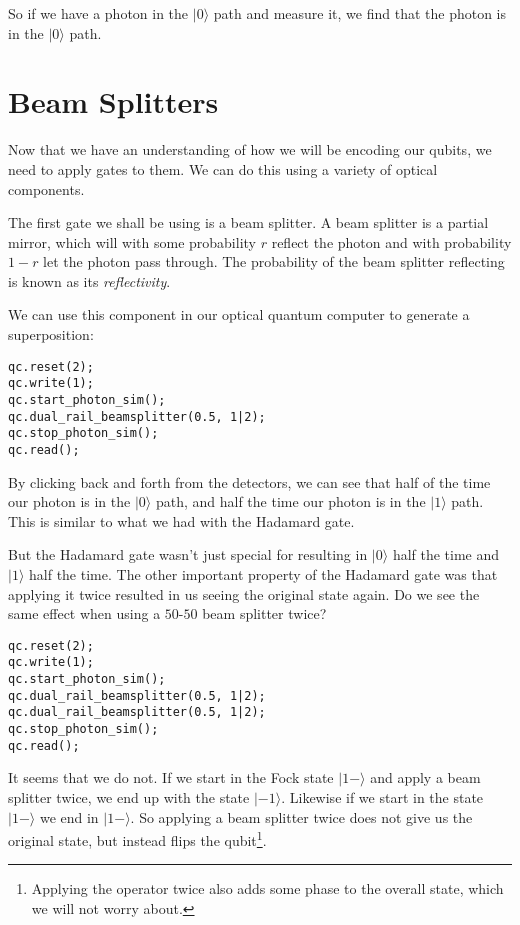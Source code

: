\documentclass[twocolumn]{article}
\begin{document}
So if we have a photon in the $|0\rangle$ path and measure it, we find that the photon is in the $|0\rangle$ path.

\section{Beam Splitters}

Now that we have an understanding of how we will be encoding our qubits, we need to apply gates to them. We can do this using a variety of optical components.

The first gate we shall be using is a beam splitter. A beam splitter is a partial mirror, which will with some probability $r$ reflect the photon and with probability $1 - r$ let the photon pass through. The probability of the beam splitter reflecting is known as its {\em reflectivity}.

We can use this component in our optical quantum computer to generate a superposition:

\begin{lstlisting}
qc.reset(2);
qc.write(1);
qc.start_photon_sim();
qc.dual_rail_beamsplitter(0.5, 1|2);
qc.stop_photon_sim();
qc.read();
\end{lstlisting}

By clicking back and forth from the detectors, we can see that half of the time  our photon is in the $|0\rangle$ path, and half the time our photon is in the $|1\rangle$ path. This is similar to what we had with the Hadamard gate.

But the Hadamard gate wasn't just special for resulting in $|0\rangle$ half the time and $|1\rangle$ half the time. The other important property of the Hadamard gate was that applying it twice resulted in us seeing the original state again. Do we see the same effect when using a $50$-$50$ beam splitter twice?

\begin{lstlisting}
qc.reset(2);
qc.write(1);
qc.start_photon_sim();
qc.dual_rail_beamsplitter(0.5, 1|2);
qc.dual_rail_beamsplitter(0.5, 1|2);
qc.stop_photon_sim();
qc.read();
\end{lstlisting}

It seems that we do not. If we start in the Fock state $|1-\rangle$ and apply a beam splitter twice, we end up with the state $|-1\rangle$. Likewise if we start in the state $|1-\rangle$ we end in $|1-\rangle$. So applying a beam splitter twice does not give us the original state, but instead flips the qubit\footnote{Applying the operator twice also adds some phase to the overall state, which we will not worry about.}.
\end{document}
